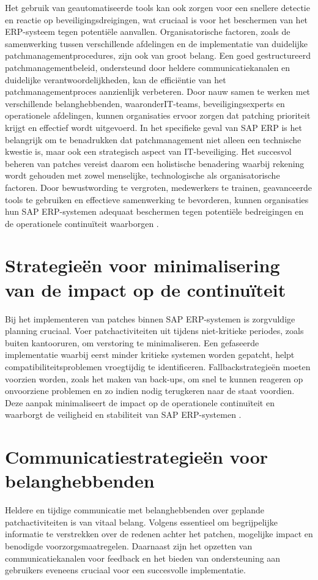 Het gebruik van geautomatiseerde tools kan ook zorgen voor een snellere detectie en reactie op beveiligingsdreigingen,
wat cruciaal is voor het beschermen van het ERP-systeem tegen potentiële aanvallen. Organisatorische factoren, zoals 
de samenwerking tussen verschillende afdelingen en de implementatie van duidelijke patchmanagementprocedures, zijn ook van groot belang. Een goed
 gestructureerd patchmanagementbeleid, ondersteund door heldere communicatiekanalen en duidelijke verantwoordelijkheden, kan de efficiëntie van het patchmanagementproces aanzienlijk verbeteren. Door nauw
 samen te werken met verschillende belanghebbenden, waaronderIT-teams, beveiligingsexperts en operationele afdelingen, kunnen organisaties ervoor zorgen dat patching prioriteit krijgt en effectief wordt uitgevoerd.
In het specifieke geval van SAP ERP is het belangrijk om te benadrukken dat patchmanagement niet alleen een technische kwestie is, maar ook een strategisch aspect van IT-beveiliging.
Het succesvol beheren van patches vereist daarom een holistische benadering waarbij rekening wordt gehouden met zowel menselijke, technologische als organisatorische factoren.
Door bewustwording te vergroten, medewerkers te trainen, geavanceerde tools te gebruiken en effectieve samenwerking te bevorderen, 
kunnen organisaties hun SAP ERP-systemen adequaat beschermen tegen potentiële bedreigingen en de operationele continuïteit waarborgen \autocite{Graffeo2018}.

\section{Strategieën voor minimalisering van de impact op de continuïteit}
Bij het implementeren van patches binnen SAP ERP-systemen is zorgvuldige planning cruciaal. Voer patchactiviteiten uit tijdens niet-kritieke periodes, zoals buiten kantooruren, om verstoring te minimaliseren. Een gefaseerde implementatie waarbij eerst minder kritieke systemen worden gepatcht, helpt
 compatibiliteitsproblemen vroegtijdig te identificeren. Fallbackstrategieën moeten voorzien worden, zoals het maken van back-ups, om snel te kunnen reageren op onvoorziene problemen en zo indien nodig terugkeren naar de staat voordien. Deze aanpak minimaliseert de impact op de operationele continuïteit en waarborgt de veiligheid en stabiliteit van SAP ERP-systemen \autocite{Shein2022}.

\section{Communicatiestrategieën voor belanghebbenden}
Heldere en tijdige communicatie met belanghebbenden over geplande patchactiviteiten is van vitaal belang. Volgens \textcite{Toren2019} essentieel om begrijpelijke informatie te verstrekken over de redenen achter het patchen,
mogelijke impact en benodigde voorzorgsmaatregelen. Daarnaast zijn het opzetten van communicatiekanalen voor feedback en het bieden van ondersteuning aan gebruikers eveneens cruciaal voor een succesvolle implementatie.


